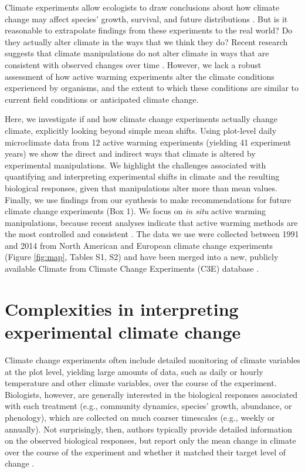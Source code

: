 \documentclass{article}
\begin{document}
\par Climate experiments allow ecologists to draw conclusions about how climate change may affect species' growth, survival, and future distributions \citep{dukes1999,hobbie1999,morin2010,chuine2012,reich2015,gruner2016}. But is it reasonable to extrapolate findings from these experiments to the real world? Do they actually alter climate in the ways that we think they do? Recent research suggests that climate manipulations do not alter climate in ways that are consistent with observed changes over time \citep{wolkovich2012}. However, we lack a robust assessment of how active warming experiments alter the climate conditions experienced by organisms, and the extent to which these conditions are similar to current field conditions or anticipated climate change. 

\par Here, we investigate if and how climate change experiments actually change climate, explicitly looking beyond simple mean shifts. Using plot-level daily microclimate data from 12 active warming experiments (yielding 41 experiment years) we show the direct and indirect ways that climate is altered by experimental manipulations. We highlight the challenges associated with quantifying and interpreting experimental shifts in climate and the resulting biological responses, given that manipulations alter more than mean values. Finally, we use findings from our synthesis to make recommendations for future climate change experiments (Box 1). We focus on \textit{in situ} active warming manipulations, because recent analyses indicate that active warming methods are the most controlled and consistent \citep{kimball2005,kimball2008,aronson2009,wolkovich2012}. The data we use were collected between 1991 and 2014 from North American and European climate change experiments (Figure \ref{fig:map}, Tables S1, S2) and have been merged into a new, publicly available Climate from Climate Change Experiments (C3E) database \citep{ettinger2017}. 

\section* {Complexities in interpreting experimental climate change} 

Climate change experiments often include detailed monitoring of climate variables at the plot level, yielding large amounts of data, such as daily or hourly temperature and other climate variables, over the course of the experiment. Biologists, however, are generally interested in the biological responses associated with each treatment (e.g., community dynamics, species' growth, abundance, or phenology), which are collected on much coarser timescales (e.g., weekly or annually). Not surprisingly, then, authors typically provide detailed information on the observed biological responses, but report only the mean change in climate over the course of the experiment and whether it matched their target level of change \citep[e.g.,][]{price1998,clark2014a,clark2014b,rollinson2012}. 
\end{document}
